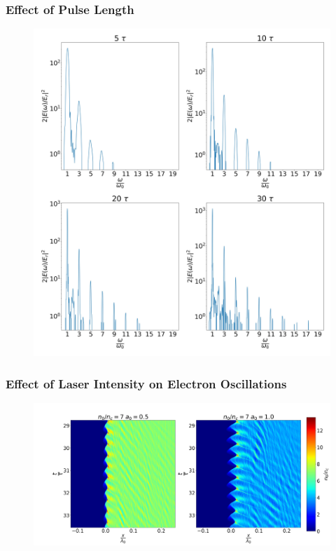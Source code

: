 \documentclass{beamer}
\begin{document}
\begin{frame}
\end{frame}

\begin{frame}
    \frametitle{Effect of Pulse Length}
    \begin{figure}
        \centering
        \includegraphics[width=1.0\textwidth, height=0.8\textheight]{images/pulse.jpg}
        \label{fig:LaserPulsev}
    \end{figure}
\end{frame}
\begin{frame}
    \frametitle{Effect of Laser Intensity on Electron Oscillations}
    \begin{figure}
        \centering
        \includegraphics[width=1.0\textwidth, height=0.8\textheight]{images/oscillation1.jpg}
        \label{fig:Oscillations1}
    \end{figure}
\end{frame}
\end{document}
